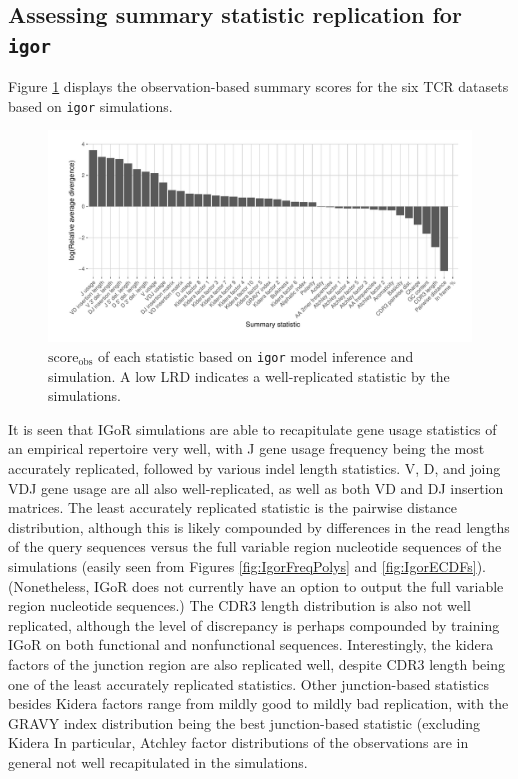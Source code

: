 \documentclass{article}
\begin{document}
\subsection*{Assessing summary statistic replication for \texttt{igor}}
Figure \ref{fig:ObsScoresTCR} displays the observation-based summary scores for the six TCR datasets based on \texttt{igor} simulations.
\begin{figure}
    \includegraphics[width=\linewidth]{Figures/IgorScores/obs_score_plot.pdf}
    \caption{$\text{score}_\text{obs}$ of each statistic based on \texttt{igor} model inference and simulation.
        A low LRD indicates a well-replicated statistic by the simulations.
    }
    \label{fig:ObsScoresTCR}
\end{figure}
It is seen that IGoR simulations are able to recapitulate gene usage statistics of an empirical repertoire very well, with J gene usage frequency being the most accurately replicated, followed by various indel length statistics.
V, D, and joing VDJ gene usage are all also well-replicated, as well as both VD and DJ insertion matrices.
The least accurately replicated statistic is the pairwise distance distribution, although this is likely compounded by differences in the read lengths of the query sequences versus the full variable region nucleotide sequences of the simulations (easily seen from Figures \ref{fig:IgorFreqPolys} and \ref{fig:IgorECDFs}).
(Nonetheless, IGoR does not currently have an option to output the full variable region nucleotide sequences.)
The CDR3 length distribution is also not well replicated, although the level of discrepancy is perhaps compounded by training IGoR on both functional and nonfunctional sequences.
Interestingly, the kidera factors of the junction region are also replicated well, despite CDR3 length being one of the least accurately replicated statistics.
Other junction-based statistics besides Kidera factors range from mildly good to mildly bad replication, with the GRAVY index distribution being the best junction-based statistic (excluding Kidera
In particular, Atchley factor distributions of the observations are in general not well recapitulated in the simulations.
\end{document}
